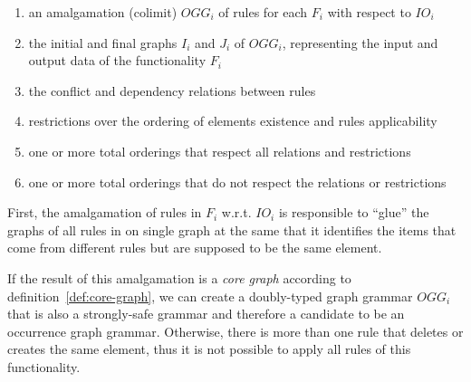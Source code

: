 \begin{enumerate}
\item an amalgamation (colimit) $OGG_i$ of rules for each $F_i$ with respect to $IO_i$
\item the initial and final graphs $I_i$ and $J_i$ of $OGG_i$, representing the input and output data of the functionality $F_i$
\item the conflict and dependency relations between rules 
\item restrictions over the ordering of elements existence and rules applicability
\item one or more total orderings that respect all relations and restrictions
\item one or more total orderings that do not respect the relations or restrictions
\end{enumerate}

First, the amalgamation of rules in $F_i$ w.r.t. $IO_i$ is responsible to ``glue'' the graphs of all rules in on single graph at the same that it identifies the items that come from different rules but are supposed to be the same element. 

If the result of this amalgamation is a \emph{core graph} according to definition~\ref{def:core-graph}, we can create a doubly-typed graph grammar $OGG_i$ that is also a strongly-safe grammar and therefore a candidate to be an occurrence graph grammar. Otherwise, there is more than one rule that deletes or creates
the same element, thus it is not possible to apply all rules of this functionality.


